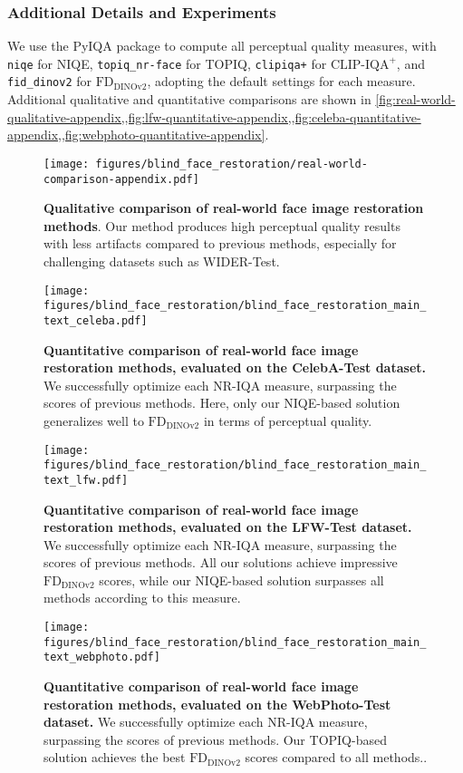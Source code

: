 \subsubsection{Additional Details and Experiments}
We use the PyIQA package to compute all perceptual quality measures, with \texttt{niqe} for NIQE, \texttt{topiq\_nr-face} for TOPIQ, \texttt{clipiqa+} for $\text{CLIP-IQA}^{+}$, and \texttt{fid\_dinov2} for $\text{FD}_{\text{DINOv2}}$, adopting the default settings for each measure.
Additional qualitative and quantitative comparisons are shown in \cref{fig:real-world-qualitative-appendix,,fig:lfw-quantitative-appendix,,fig:celeba-quantitative-appendix,,fig:webphoto-quantitative-appendix}.

\begin{figure}
    \centering
    \texttt{[image: figures/blind\_face\_restoration/real-world-comparison-appendix.pdf]}
    \caption{\textbf{Qualitative comparison of real-world face image restoration methods}. Our method produces high perceptual quality results with less artifacts compared to previous methods, especially for challenging datasets such as WIDER-Test.}
    \label{fig:real-world-qualitative-appendix}
\end{figure}
\begin{figure}
    \centering
    \texttt{[image: figures/blind\_face\_restoration/blind\_face\_restoration\_main\_text\_celeba.pdf]}
    \caption{\textbf{Quantitative comparison of real-world face image restoration methods, evaluated on the CelebA-Test dataset.} We successfully optimize each NR-IQA measure, surpassing the scores of previous methods. Here, only our NIQE-based solution generalizes well to $\text{FD}_{\text{DINOv2}}$ in terms of perceptual quality.}
    \label{fig:celeba-quantitative-appendix}
\end{figure}
\begin{figure}
    \centering
    \texttt{[image: figures/blind\_face\_restoration/blind\_face\_restoration\_main\_text\_lfw.pdf]}
    \caption{\textbf{Quantitative comparison of real-world face image restoration methods, evaluated on the LFW-Test dataset.} We successfully optimize each NR-IQA measure, surpassing the scores of previous methods. All our solutions achieve impressive $\text{FD}_{\text{DINOv2}}$ scores, while our NIQE-based solution surpasses all methods according to this measure.}
    \label{fig:lfw-quantitative-appendix}
\end{figure}
\begin{figure}
    \centering
    \texttt{[image: figures/blind\_face\_restoration/blind\_face\_restoration\_main\_text\_webphoto.pdf]}
    \caption{\textbf{Quantitative comparison of real-world face image restoration methods, evaluated on the WebPhoto-Test dataset.} We successfully optimize each NR-IQA measure, surpassing the scores of previous methods. Our TOPIQ-based solution achieves the best $\text{FD}_{\text{DINOv2}}$ scores compared to all methods..}
    \label{fig:webphoto-quantitative-appendix}
\end{figure}
